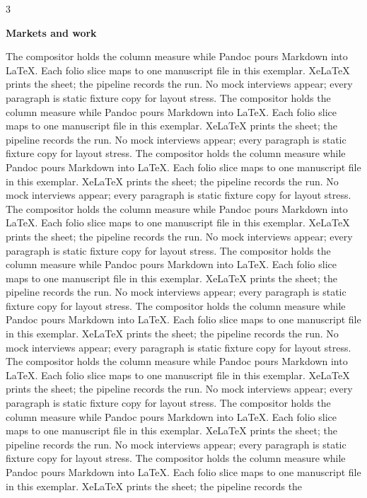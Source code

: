 \documentclass[
]{article}
\begin{document}
\begin{multicols}{3}

\textbf{Markets and work}

The compositor holds the column measure while Pandoc pours Markdown into
LaTeX. Each folio slice maps to one manuscript file in this exemplar.
XeLaTeX prints the sheet; the pipeline records the run. No mock
interviews appear; every paragraph is static fixture copy for layout
stress. The compositor holds the column measure while Pandoc pours
Markdown into LaTeX. Each folio slice maps to one manuscript file in
this exemplar. XeLaTeX prints the sheet; the pipeline records the run.
No mock interviews appear; every paragraph is static fixture copy for
layout stress. The compositor holds the column measure while Pandoc
pours Markdown into LaTeX. Each folio slice maps to one manuscript file
in this exemplar. XeLaTeX prints the sheet; the pipeline records the
run. No mock interviews appear; every paragraph is static fixture copy
for layout stress. The compositor holds the column measure while Pandoc
pours Markdown into LaTeX. Each folio slice maps to one manuscript file
in this exemplar. XeLaTeX prints the sheet; the pipeline records the
run. No mock interviews appear; every paragraph is static fixture copy
for layout stress. The compositor holds the column measure while Pandoc
pours Markdown into LaTeX. Each folio slice maps to one manuscript file
in this exemplar. XeLaTeX prints the sheet; the pipeline records the
run. No mock interviews appear; every paragraph is static fixture copy
for layout stress. The compositor holds the column measure while Pandoc
pours Markdown into LaTeX. Each folio slice maps to one manuscript file
in this exemplar. XeLaTeX prints the sheet; the pipeline records the
run. No mock interviews appear; every paragraph is static fixture copy
for layout stress. The compositor holds the column measure while Pandoc
pours Markdown into LaTeX. Each folio slice maps to one manuscript file
in this exemplar. XeLaTeX prints the sheet; the pipeline records the
run. No mock interviews appear; every paragraph is static fixture copy
for layout stress. The compositor holds the column measure while Pandoc
pours Markdown into LaTeX. Each folio slice maps to one manuscript file
in this exemplar. XeLaTeX prints the sheet; the pipeline records the
run. No mock interviews appear; every paragraph is static fixture copy
for layout stress. The compositor holds the column measure while Pandoc
pours Markdown into LaTeX. Each folio slice maps to one manuscript file
in this exemplar. XeLaTeX prints the sheet; the pipeline records the

\end{multicols}
\end{document}
